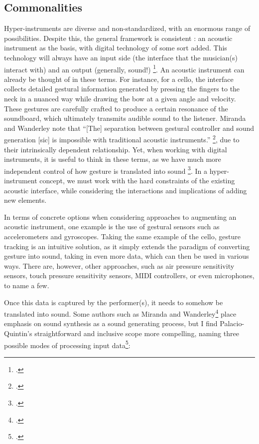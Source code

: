 \documentclass[12pt,twoside,maitrise]{dms_ks}
\theoremstyle{definition}
\begin{document}
\subsection{Commonalities}

Hyper-instruments are diverse and non-standardized, with an enormous range of possibilities.  
Despite this, the general framework is consistent : an acoustic instrument as the basis, with digital technology of some sort added. 
This technology will always have an input side (the interface that the musician(s) interact with) and an output (generally, sound!) \footcite[3]{miranda_new_2006}. 
An acoustic instrument can already be thought of in these terms.
For instance, for a cello, the interface collects detailed gestural information generated by pressing the fingers to the neck in a nuanced way while drawing the bow at a given angle and velocity. 
These gestures are carefully crafted to produce a certain resonance of the soundboard, which ultimately transmits audible sound to the listener. 
Miranda and Wanderley note that “[The] separation between gestural controller and sound generation [sic] is impossible with traditional acoustic instruments.” \footcite[3]{miranda_new_2006}, due to their intrinsically dependent relationship.
Yet, when working with digital instruments, it is useful to think in these terms, as we have much more independent control of how gesture is translated into sound \footcite[24--25]{jorda_digital_2005}.
In a hyper-instrument concept, we must work with the hard constraints of the existing acoustic interface, while considering the interactions and implications of adding new elements. 

In terms of concrete options when considering approaches to augmenting an acoustic instrument, one example is the use of gestural sensors such as accelerometers and gyroscopes. 
Taking the same example of the cello, gesture tracking is an intuitive solution, as it simply extends the paradigm of converting gesture into sound, taking in even more data, which can then be used in various ways. 
There are, however, other approaches, such as air pressure sensitivity sensors, touch pressure sensitivity sensors, MIDI controllers, or even microphones, to name a few. 


Once this data is captured by the performer(s), it needs to somehow be translated into sound. Some authors such as Miranda and Wanderley\footcite[3]{miranda_new_2006} place emphasis on sound synthesis as a sound generating process, but I find Palacio-Quintin's straightforward and inclusive scope more compelling, naming three possible modes of processing input data\footcite[52]{palacio-quintin_composition_2012-1}:
\end{document}
